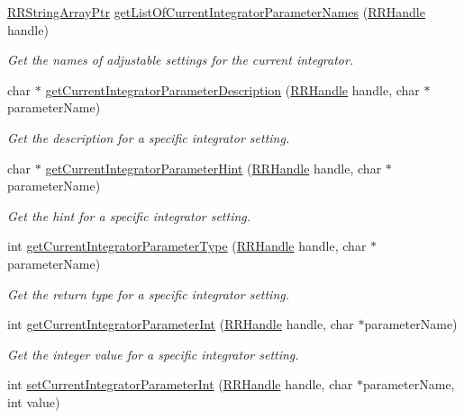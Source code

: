 \begin{DoxyCompactItemize}
\hyperlink{rrc__types_8h_a7c9475df6c7337d99482b13a365e7596}{R\+R\+String\+Array\+Ptr} \hyperlink{group__simopts_ga8bc1ea6950f141d40373416d64abaefa}{get\+List\+Of\+Current\+Integrator\+Parameter\+Names} (\hyperlink{rrc__types_8h_a1d68f0592372208fa5a5f2799ea4b3ae}{R\+R\+Handle} handle)
\begin{DoxyCompactList}\small\item\em Get the names of adjustable settings for the current integrator. \end{DoxyCompactList}\item 
char $\ast$ \hyperlink{group__simopts_gae4308a0893d84e49ef877d2db65d110c}{get\+Current\+Integrator\+Parameter\+Description} (\hyperlink{rrc__types_8h_a1d68f0592372208fa5a5f2799ea4b3ae}{R\+R\+Handle} handle, char $\ast$parameter\+Name)
\begin{DoxyCompactList}\small\item\em Get the description for a specific integrator setting. \end{DoxyCompactList}\item 
char $\ast$ \hyperlink{group__simopts_ga4cc4c3b42b58f7ce266cff67cbc79c85}{get\+Current\+Integrator\+Parameter\+Hint} (\hyperlink{rrc__types_8h_a1d68f0592372208fa5a5f2799ea4b3ae}{R\+R\+Handle} handle, char $\ast$parameter\+Name)
\begin{DoxyCompactList}\small\item\em Get the hint for a specific integrator setting. \end{DoxyCompactList}\item 
int \hyperlink{group__simopts_ga04f015cae3234d1e24dc86c4ca6cf7ab}{get\+Current\+Integrator\+Parameter\+Type} (\hyperlink{rrc__types_8h_a1d68f0592372208fa5a5f2799ea4b3ae}{R\+R\+Handle} handle, char $\ast$parameter\+Name)
\begin{DoxyCompactList}\small\item\em Get the return type for a specific integrator setting. \end{DoxyCompactList}\item 
int \hyperlink{group__simopts_ga23b63638fae7a4823ac503474126c85b}{get\+Current\+Integrator\+Parameter\+Int} (\hyperlink{rrc__types_8h_a1d68f0592372208fa5a5f2799ea4b3ae}{R\+R\+Handle} handle, char $\ast$parameter\+Name)
\begin{DoxyCompactList}\small\item\em Get the integer value for a specific integrator setting. \end{DoxyCompactList}\item 
int \hyperlink{group__simopts_ga4b5b2be1b4a77b8225f5c7d9a1e0bdfb}{set\+Current\+Integrator\+Parameter\+Int} (\hyperlink{rrc__types_8h_a1d68f0592372208fa5a5f2799ea4b3ae}{R\+R\+Handle} handle, char $\ast$parameter\+Name, int value)

\end{DoxyCompactItemize}
